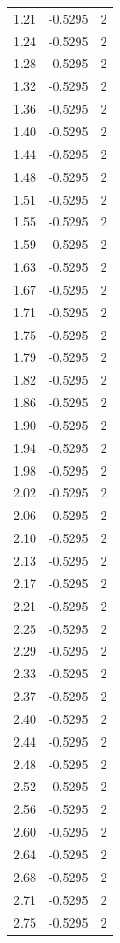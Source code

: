 \begin{longtable}{lrr}
  1.21 & -0.5295 & 2 \\
  1.24 & -0.5295 & 2 \\
  1.28 & -0.5295 & 2 \\
  1.32 & -0.5295 & 2 \\
  1.36 & -0.5295 & 2 \\
  1.40 & -0.5295 & 2 \\
  1.44 & -0.5295 & 2 \\
  1.48 & -0.5295 & 2 \\
  1.51 & -0.5295 & 2 \\
  1.55 & -0.5295 & 2 \\
  1.59 & -0.5295 & 2 \\
  1.63 & -0.5295 & 2 \\
  1.67 & -0.5295 & 2 \\
  1.71 & -0.5295 & 2 \\
  1.75 & -0.5295 & 2 \\
  1.79 & -0.5295 & 2 \\
  1.82 & -0.5295 & 2 \\
  1.86 & -0.5295 & 2 \\
  1.90 & -0.5295 & 2 \\
  1.94 & -0.5295 & 2 \\
  1.98 & -0.5295 & 2 \\
  2.02 & -0.5295 & 2 \\
  2.06 & -0.5295 & 2 \\
  2.10 & -0.5295 & 2 \\
  2.13 & -0.5295 & 2 \\
  2.17 & -0.5295 & 2 \\
  2.21 & -0.5295 & 2 \\
  2.25 & -0.5295 & 2 \\
  2.29 & -0.5295 & 2 \\
  2.33 & -0.5295 & 2 \\
  2.37 & -0.5295 & 2 \\
  2.40 & -0.5295 & 2 \\
  2.44 & -0.5295 & 2 \\
  2.48 & -0.5295 & 2 \\
  2.52 & -0.5295 & 2 \\
  2.56 & -0.5295 & 2 \\
  2.60 & -0.5295 & 2 \\
  2.64 & -0.5295 & 2 \\
  2.68 & -0.5295 & 2 \\
  2.71 & -0.5295 & 2 \\
  2.75 & -0.5295 & 2 \\

\end{longtable}

